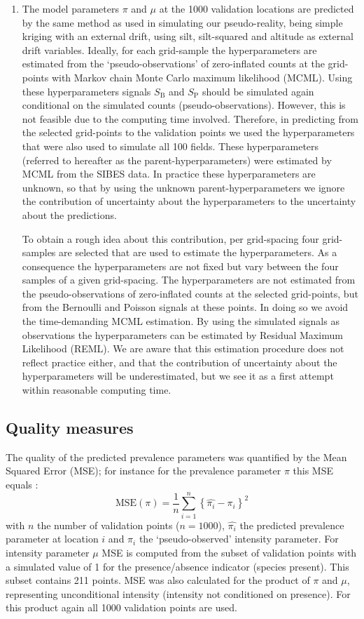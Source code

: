 \documentclass[review]{elsarticle}
\begin{document}
\begin{enumerate}
\item
The model parameters $\pi$ and $\mu$ at the 1000 validation locations are predicted by the same method as used in simulating our pseudo-reality, being simple kriging with an external drift, using silt, silt-squared and altitude as external drift variables. Ideally, for each grid-sample the hyperparameters are estimated from the `pseudo-observations' of zero-inflated counts at the grid-points with Markov chain Monte Carlo maximum likelihood (MCML). Using these hyperparameters signals $S_{\mathrm{B}}$ and $S_{\mathrm{P}}$ should be simulated again conditional on the simulated counts (pseudo-observations).  However, this is not feasible due to the computing time involved. Therefore, in predicting from the selected grid-points to the validation points we used the hyperparameters that were also used to simulate all 100 fields. These hyperparameters (referred to hereafter as the parent-hyperparameters) were estimated by MCML from the SIBES data. In practice these hyperparameters are unknown, so that by using the unknown parent-hyperparameters we ignore the contribution of uncertainty about the hyperparameters to the uncertainty about the predictions.

To obtain a rough idea about this contribution, per grid-spacing four grid-samples are selected that are used to estimate the hyperparameters. As a consequence the hyperparameters are not fixed but vary between the four samples of a given grid-spacing. The hyperparameters are not estimated from the pseudo-observations of zero-inflated counts at the selected grid-points, but from the Bernoulli and Poisson signals at these points. In doing so we avoid the time-demanding MCML estimation. By using the simulated signals as observations the hyperparameters can be estimated by Residual Maximum Likelihood (REML). We are aware that this estimation procedure does not reflect practice either, and that the contribution of uncertainty about the hyperparameters will be underestimated, but we see it as a first attempt within reasonable computing time.
\end{enumerate}

\subsection{Quality measures}
The quality of the predicted prevalence parameters was quantified by the Mean Squared Error (MSE); for instance for the prevalence parameter $\pi$ this MSE equals :
\begin{equation}
    \text{MSE}(\pi)=\frac{1}{n}\sum_{i=1}^{n} \left\{\hat{\pi_{i}} - \pi_{i} \right\}^{2}
\label{eq:mse}
\end{equation}
with $n$ the number of validation points ($n=1000$), $\hat{\pi_{i}}$ the predicted prevalence parameter at location $i$ and $\pi_{i}$ the `pseudo-observed' intensity parameter. For intensity parameter $\mu$ MSE is computed from the subset of validation points with a simulated value of 1 for the presence/absence indicator (species present). This subset contains 211 points. MSE was also calculated for the product of $\pi$ and $\mu$, representing unconditional intensity (intensity not conditioned on presence). For this product again all 1000 validation points are used.
\end{document}

